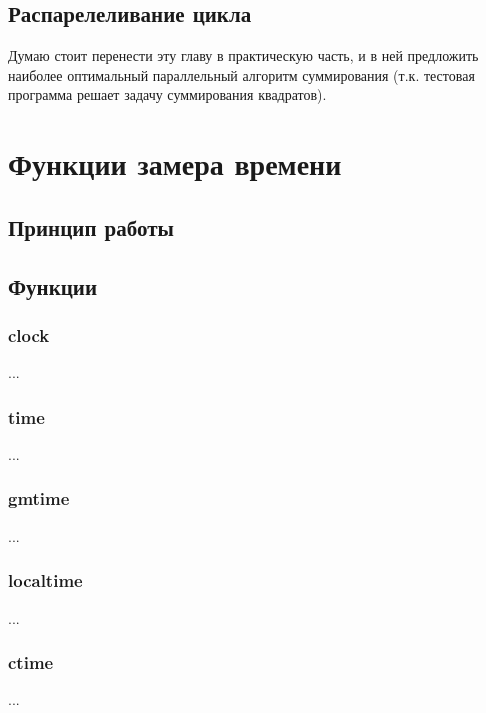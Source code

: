\documentclass{article}
\begin{document}
		\subsection{Распарелеливание цикла}
			Думаю стоит перенести эту главу в практическую часть, и в ней предложить наиболее оптимальный параллельный алгоритм 			суммирования (т.к. тестовая программа решает задачу суммирования квадратов).
	\newpage
	\section{Функции замера времени}
		\subsection{Принцип работы}	
		\subsection{Функции}
			\subsubsection*{clock} ...
			\subsubsection*{time} ...
			\subsubsection*{gmtime} ...
			\subsubsection*{localtime} ...
			\subsubsection*{ctime} ... 
\end{document}
